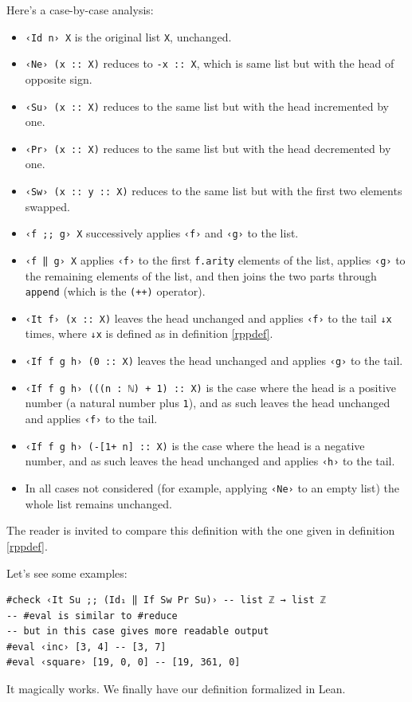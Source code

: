 \documentclass{book}
\theoremstyle{definition}
\theoremstyle{remark}
\theoremstyle{plain}
\begin{document}
Here's a case-by-case analysis:
\begin{itemize}
\item \lstinline{‹Id n› X} is the original list \lstinline{X}, unchanged.
\item \lstinline{‹Ne› (x :: X)} reduces to \lstinline{-x :: X}, which is same list but with the head of opposite sign.
\item \lstinline{‹Su› (x :: X)} reduces to the same list but with the head incremented by one.
\item \lstinline{‹Pr› (x :: X)} reduces to the same list but with the head decremented by one.
\item \lstinline{‹Sw› (x :: y :: X)} reduces to the same list but with the first two elements swapped.
\item \lstinline{‹f ;; g› X} successively applies \lstinline{‹f›} and \lstinline{‹g›} to the list.
\item \lstinline{‹f ‖ g› X} applies \lstinline{‹f›} to the first \lstinline{f.arity} elements of the list,
applies \lstinline{‹g›} to the remaining elements of the list,
and then joins the two parts through \lstinline{append} (which is the \lstinline{(++)} operator).
\item \lstinline{‹It f› (x :: X)} leaves the head unchanged and applies \lstinline{‹f›} to the tail \lstinline{↓x} times,
where \lstinline{↓x} is defined as in definition \ref{rppdef}.
\item \lstinline{‹If f g h› (0 :: X)} leaves the head unchanged and applies \lstinline{‹g›} to the tail.
\item \lstinline{‹If f g h› (((n : ℕ) + 1) :: X)} is the case where the head is a positive number
(a natural number plus \lstinline{1}),
and as such leaves the head unchanged and applies \lstinline{‹f›} to the tail.
\item \lstinline{‹If f g h› (-[1+ n] :: X)} is the case where the head is a negative number,
and as such leaves the head unchanged and applies \lstinline{‹h›} to the tail.
\item In all cases not considered (for example, applying \lstinline{‹Ne›} to an empty list) the whole list remains unchanged. 
\end{itemize}

The reader is invited to compare this definition with the one given in definition \ref{rppdef}.

Let's see some examples:
\begin{lstlisting}
#check ‹It Su ;; (Id₁ ‖ If Sw Pr Su)› -- list ℤ → list ℤ
-- #eval is similar to #reduce
-- but in this case gives more readable output
#eval ‹inc› [3, 4] -- [3, 7]
#eval ‹square› [19, 0, 0] -- [19, 361, 0]
\end{lstlisting}
It magically works. We finally have our definition formalized in Lean.
\end{document}
